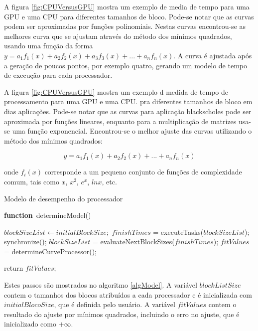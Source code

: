 A figura \ref{fig:CPUVersusGPU} mostra um exemplo de media de tempo para uma GPU e uma CPU para diferentes tamanhos de bloco. Pode-se notar que as curvas podem ser aproximadas por funções polinomiais. Nestas curvas encontrou-se as melhores curva que se ajustam através do método dos mínimos quadrados, usando uma função da forma $y= a_1f_1(x) + a_2f_2(x) + a_3f_3(x) + ... + a_nf_n(x)$. A curva é ajustada após a geração de poucos pontos, por exemplo quatro, gerando um modelo de tempo de execução para cada processador.

A figura \ref{fig:CPUVersusGPU} mostra um exemplo d medida de tempo de processamento para uma GPU e uma CPU. pra diferentes tamanhos de bloco em dias aplicações. Pode-se notar que as curvas para aplicação blackscholes pode ser aproximada por funções lineares, enquanto para a multiplicação de matrizes usa-se uma função exponencial. Encontrou-se o melhor ajuste das curvas utilizando o método dos mínimos quadrados:

\begin{equation}
 y = a_{1} f_{1}(x) +  a_{2} f_{2}(x) + ... + a_{n} f_{n}(x) 
\label{eq: least}
\end{equation} 

onde $f_i(x)$ corresponde a um pequeno conjunto de funções de complexidade comum, tais como $x$, $x^2$, $e^x$, $ln x$, etc. 

\begin{algorithm}

\caption{Modelo de desempenho do processador}
\label{algModel}

\begin{algorithmic}		

\STATE \textbf{function}~determineModel()

\STATE $blockSizeList \leftarrow initialBlockSize;$
		\STATE $finishTimes$ = executeTasks($blockSizeList$);
                \STATE synchronize();
	        \STATE $blockSizeList$ = evaluateNextBlockSizes($finishTimes$);
		\STATE $fitValues$ = determineCurveProcessor();
\ENDWHILE

return $fitValues$;

\end{algorithmic}
\end{algorithm}

Estes passos são mostrados no algoritmo \ref{algModel}. A variável $blockListSize$ contem o tamanhos dos blocos atribuídos a cada processador e é inicializada com $initialBlocoSize$, que é definida  pelo usuário. A variável $fitValues$ contem o resultado do ajuste por mínimos quadrados, incluindo o erro no ajuste, que é inicializado como $+\infty$.

